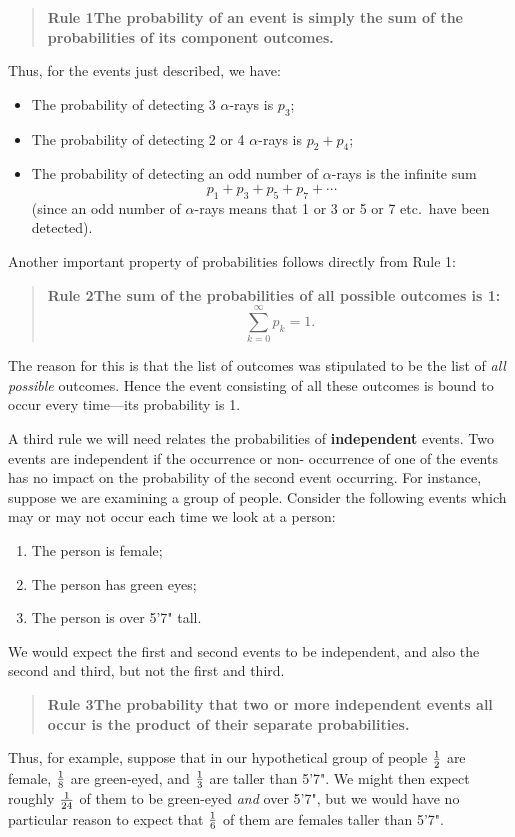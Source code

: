 {{{{\begin{quote}
{\bf Rule 1\quad The {\bf probability of an event} is simply the sum of the probabilities of its component outcomes.}\label{rule1}
\end{quote}
Thus, for the events just described, we have:
\begin{itemize}
\item The probability of detecting 3 $\alpha$-rays is $p_3$;
\item The probability of detecting 2 or 4 $\alpha$-rays is $p_2+p_4$;
\item The probability of detecting an odd number of $\alpha$-rays is
the infinite sum
\[
p_1+p_3+p_5+p_7+\cdots 
\]
(since an odd number of $\alpha$-rays means that 1 or 3 or 5
or 7 etc.~have been detected).
\end{itemize}

Another important property of probabilities follows directly from Rule 1:
\begin{quote}

{\bf Rule 2\quad The sum of the probabilities of all possible outcomes is 1:
\[
 \sum_{k=0}^\infty p_k=1.
\]
}
\end{quote}
The reason for this is that the list of outcomes was stipulated to be the list of {\em all possible} outcomes. Hence the event consisting of all these outcomes is bound to occur every time---its probability is 1.

A third rule we will need relates the probabilities of {\bf independent} events.  Two events are independent if the  occurrence or non- occurrence of one of the events has no impact on the probability of the second event occurring.  For instance, suppose we are examining a group of people.  Consider the following events which may or may not occur each time we look at a person:
\begin{enumerate}
\item The person is female;
\item The person has green eyes;
\item The person is over 5'7" tall.
\end{enumerate}
We would expect the first and second events to be independent, and also the second and third, but not the first and third. 
\begin{quote}

{\bf Rule 3\quad The probability that two or more independent events all occur is the product of their separate probabilities.}\label{rule3}
\end{quote}
Thus, for example, suppose that in our hypothetical group of people ${1 \over 2}$ are female, ${1 \over 8}$ are green-eyed, and ${1 \over 3}$ are taller than 5'7".  We might then expect roughly ${1 \over 24}$ of them to be green-eyed {\em and} over 5'7", but we would have no particular reason to expect that  ${1 \over 6}$ of them are females taller than 5'7".

}}}}
